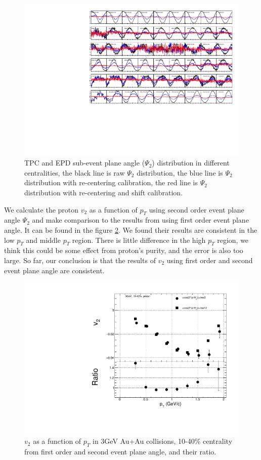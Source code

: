 \begin{figure}[h]
\includegraphics[scale=0.6]{chapter3/fig/second/psi2.pdf}
\caption{\label{psi2_dis_tpc_epd} TPC and EPD sub-event plane angle ($\Psi_{2}$) distribution in different centralities, the black line is raw $\Psi_{2}$ distribution, the blue line is $\Psi_{2}$ distribution with re-centering calibration, the red line is $\Psi_{2}$ distribution with re-centering and shift calibration.}
\end{figure}

We calculate the proton $v_{2}$ as a function of $p_{T}$ using second order event plane angle $\Psi_{2}$ and make comparison to the results from using first order event plane angle. It can be found in the figure \ref{v2pt_sec_com}. We found their results are consistent in the low $p_{T}$ and middle $p_{T}$ region. There is little difference in the high $p_{T}$ region, we think this could be some effect from proton's purity, and the error is also too large. So far, our conclusion is that the results of $v_{2}$ using first order and second event plane angle are consistent.

\begin{figure}[h]
\includegraphics[scale=0.6]{chapter3/fig/second/v2pt_com.pdf}
\caption{\label{v2pt_sec_com} $v_{2}$ as a function of $p_{T}$ in 3GeV Au+Au collisions, 10-40\% centrality from first order and second event plane angle, and their ratio.}
\end{figure}

